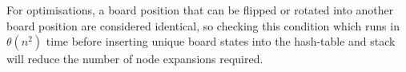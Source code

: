 \documentclass[12pt,a4paper]{article}
\begin{document}
For optimisations, a board position that can be flipped or rotated into another board position are considered identical, so checking this condition which runs in $\theta(n^2)$ time before inserting unique board states into the hash-table and stack will reduce the number of node expansions required.
\\
\end{document}
